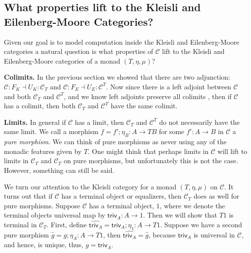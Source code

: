 \documentclass{article}
\let\mto\to
\let\to\relax
\newcommand{\to}{\rightarrow}
\newcommand{\cat}[1]{\mathcal{#1}}
\begin{document}
\subsection{What properties lift to the Kleisli and Eilenberg-Moore Categories?}
\label{subsec:what_properties_lift_to_the_kleisli_and_eilenberg-moore_categories?}
Given our goal is to model computation inside the Kleisli and
Eilenberg-Moore categories a natural question is what properties of
$\cat{C}$ lift to the Kleisli and Eilenberg-Moore categories of a
monad $(T, \eta, \mu)$?

\textbf{Colimits.} In the previous section we showed that there are
two adjunction: $\cat{C} : F_K \dashv U_K : \cat{C}_T$ and $\cat{C} :
F_E \dashv U_E : \cat{C}^T$.  Now since there is a left adjoint
between $\cat{C}$ and both $\cat{C}_T$ and $\cat{C}^T$, and we know
left adjoints preserve all colimits \cite{MacLane:1971}, then if
$\cat{C}$ has a colimit, then both $\cat{C}_T$ and $\cat{C}^T$ have
the same colimit.

\textbf{Limits.}  In general if $\cat{C}$ has a limit, then
$\cat{C}_T$ and $\cat{C}^T$ do not necessarily have the same limit.
We call a morphism $f = f';\eta_B : A \mto TB$ for some $f' : A \mto
B$ in $\cat{C}$ a \emph{pure morphism}.  We can think of pure
morphisms as never using any of the monadic features given by $T$.
One might think that perhaps limits in $\cat{C}$ will lift to limits
in $\cat{C}_T$ and $\cat{C}_T$ on pure morphisms, but unfortunately
this is not the case.  However, something can still be said.

We turn our attention to the Kleisli category for a monad $(T, \eta,
\mu)$ on $\cat{C}$. It turns out that if $\cat{C}$ has a terminal
object or equalizers, then $\cat{C}_T$ does as well for pure
morphisms.  Suppose $\cat{C}$ has a terminal object, $1$, where we
denote the terminal objects universal map by $\mathsf{triv}_A : A \mto
1$.  Then we will show that $T1$ is terminal in $\cat{C}_T$.  First,
define $\hat{\mathsf{triv}_A} = \mathsf{triv}_A;\eta_1 : A \mto T1$.
Suppose we have a second pure morphism $\hat{g} = g;\eta_A : A \mto
T1$, then $\hat{\mathsf{triv}_A} = \hat{g}$, because $\mathsf{triv}_A$
is universal in $\cat{C}$, and hence, is unique, thus, $g =
\mathsf{triv}_A$.
\end{document}
